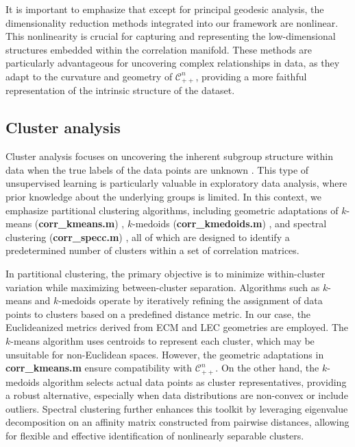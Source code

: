 \documentclass[10pt]{article}
\newcommand{\CORR}{\mathcal{C}_{++}^n}
\begin{document}
It is important to emphasize that except for principal geodesic analysis, the dimensionality reduction methods integrated into our framework are nonlinear. This nonlinearity is crucial for capturing and representing the low-dimensional structures embedded within the correlation manifold. These methods are particularly advantageous for uncovering complex relationships in data, as they adapt to the curvature and geometry of $\CORR$, providing a more faithful representation of the intrinsic structure of the dataset. 


\subsection{Cluster analysis}

Cluster analysis focuses on uncovering the inherent subgroup structure within data when the true labels of the data points are unknown \citep{kaufman_2005_FindingGroupsData}. This type of unsupervised learning is particularly valuable in exploratory data analysis, where prior knowledge about the underlying groups is limited. In this context, we emphasize partitional clustering algorithms, including geometric adaptations of $k$-means (\textbf{corr\_kmeans.m}) \citep{macqueen_1967_MethodsClassificationAnalysis}, $k$-medoids (\textbf{corr\_kmedoids.m}) \citep{kaufman_1990_PartitioningMedoidsProgram}, and spectral clustering (\textbf{corr\_specc.m}) \citep{vonluxburg_2007_TutorialSpectralClustering}, all of which are designed to identify a predetermined number of clusters within a set of correlation matrices.

In partitional clustering, the primary objective is to minimize within-cluster variation while maximizing between-cluster separation. Algorithms such as $k$-means and $k$-medoids operate by iteratively refining the assignment of data points to clusters based on a predefined distance metric. In our case, the Euclideanized metrics derived from ECM and LEC geometries are employed. The $k$-means algorithm uses centroids to represent each cluster, which may be unsuitable for non-Euclidean spaces. However, the geometric adaptations in \textbf{corr\_kmeans.m} ensure compatibility with $\CORR$. On the other hand, the $k$-medoids algorithm selects actual data points as cluster representatives, providing a robust alternative, especially when data distributions are non-convex or include outliers. Spectral clustering further enhances this toolkit by leveraging eigenvalue decomposition on an affinity matrix constructed from pairwise distances, allowing for flexible and effective identification of nonlinearly separable clusters.
\end{document}
